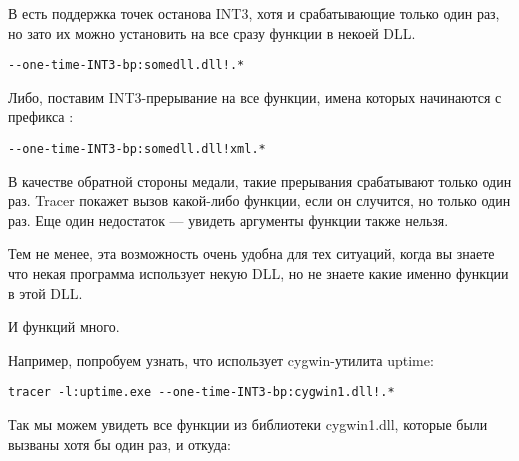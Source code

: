 В \tracer есть поддержка точек останова INT3, хотя и срабатывающие только один раз, но зато их можно установить на все
сразу функции в некоей DLL.

\begin{lstlisting}
--one-time-INT3-bp:somedll.dll!.*
\end{lstlisting}

Либо, поставим INT3-прерывание на все функции, имена которых начинаются с префикса :

\begin{lstlisting}
--one-time-INT3-bp:somedll.dll!xml.*
\end{lstlisting}

В качестве обратной стороны медали, такие прерывания срабатывают только один раз.
Tracer покажет вызов какой-либо функции, если он случится, но только один раз.
Еще один недостаток --- увидеть аргументы функции также нельзя.

Тем не менее, эта возможность очень удобна для тех ситуаций, 
когда вы знаете что некая программа использует некую DLL,
но не знаете какие именно функции в этой DLL.

И функций много. 

\par
{}
Например, попробуем узнать, что использует cygwin-утилита uptime:

\begin{lstlisting}
tracer -l:uptime.exe --one-time-INT3-bp:cygwin1.dll!.*
\end{lstlisting}

Так мы можем увидеть все функции из библиотеки cygwin1.dll, которые были вызваны хотя бы один раз, и откуда:



